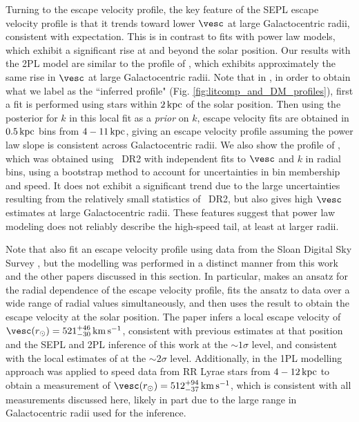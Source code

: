 Turning to the escape velocity profile, the key feature of the SEPL escape velocity profile is that it trends toward lower $\vesc$ at large Galactocentric radii, consistent with expectation. This is in contrast to fits with power law models, which exhibit a significant rise at and beyond the solar position. Our results with the 2PL model are similar to the profile of \cite{Koppelman2021}, which exhibits approximately the same rise in $\vesc$ at large Galactocentric radii. Note that in \cite{Koppelman2021}, in order to obtain what we label as the ``inferred profile" (Fig. \ref{fig:litcomp_and_DM_profiles}), first a fit is performed using stars within $2\,\rm{kpc}$ of the solar position. Then using the posterior for $k$ in this local fit as a {\emph{prior}} on $k$, escape velocity fits are obtained in $0.5\,\rm{kpc}$ bins from $4-11\,\rm{kpc}$, giving an escape velocity profile assuming the power law slope is consistent across Galactocentric radii. We also show the profile of \cite{Monari2018}, which was obtained using \Gaia~DR2 with independent fits to $\vesc$ and $k$ in radial bins, using a bootstrap method to account for uncertainties in bin membership and speed. It does not exhibit a significant trend due to the large uncertainties resulting from the relatively small statistics of \Gaia~DR2, but also gives high $\vesc$ estimates at large Galactocentric radii. These features suggest that power law modeling does not reliably describe the high-speed tail, at least at larger radii.

Note that \cite{williams:2017} also fit an escape velocity profile using data from the Sloan Digital Sky Survey \citep{SDSS:2012}, but the modelling was performed in a distinct manner from this work and the other papers discussed in this section. In particular, \cite{williams:2017} makes an ansatz for the radial dependence of the escape velocity profile, fits the ansatz to data over a wide range of radial values simultaneously, and then uses the result to obtain the escape velocity at the solar position. The paper infers a local escape velocity of $\vesc(r_\odot) = 521^{+46}_{-30}\,{\rm{km\,s^{-1}}}$, consistent with previous estimates at that position \citep{Monari2018, deason:2019, Koppelman2021} and the  SEPL and 2PL inference of this work at the $\sim 1\sigma$ level, and consistent with the local estimates of \cite{Necib2022} at the $\sim 2\sigma$ level. Additionally, in \cite{Prudil:2022} the 1PL modelling approach was applied to speed data from RR Lyrae stars from $4-12\,{\rm{kpc}}$ to obtain a measurement of $\vesc(r_\odot) = 512^{+94}_{-37}\,{\rm{km\,s^{-1}}}$, which is consistent with all measurements discussed here, likely in part due to the large range in Galactocentric radii used for the inference.